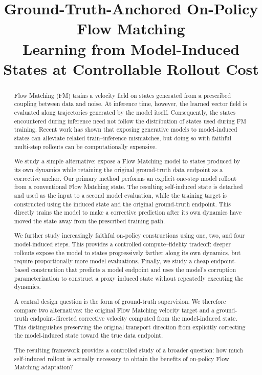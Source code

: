 \documentclass[11pt]{article}
\title{\textbf{Ground-Truth-Anchored On-Policy Flow Matching}\\
\large Learning from Model-Induced States at Controllable Rollout Cost}
\author{}
\date{}
\begin{document}
\maketitle

\begin{abstract}

Flow Matching (FM) trains a velocity field on states generated from a
prescribed coupling between data and noise. At inference time, however, the
learned vector field is evaluated along trajectories generated by the model
itself. Consequently, the states encountered during inference need not follow
the distribution of states used during FM training. Recent work has shown that
exposing generative models to model-induced states can alleviate related
train--inference mismatches, but doing so with faithful multi-step rollouts can
be computationally expensive.

We study a simple alternative: expose a Flow Matching model to states produced
by its own dynamics while retaining the original ground-truth data endpoint as
a corrective anchor. Our primary method performs an explicit one-step model
rollout from a conventional Flow Matching state. The resulting self-induced
state is detached and used as the input to a second model evaluation, while the
training target is constructed using the induced state and the original
ground-truth endpoint. This directly trains the model to make a corrective
prediction after its own dynamics have moved the state away from the prescribed
training path.

We further study increasingly faithful on-policy constructions using one, two,
and four model-induced steps. This provides a controlled compute--fidelity
tradeoff: deeper rollouts expose the model to states progressively farther
along its own dynamics, but require proportionally more model evaluations.
Finally, we study a cheap endpoint-based construction that predicts a model
endpoint and uses the model's corruption parameterization to construct a proxy
induced state without repeatedly executing the dynamics.

A central design question is the form of ground-truth supervision. We therefore
compare two alternatives: the original Flow Matching velocity target and a
ground-truth endpoint-directed corrective velocity computed from the
model-induced state. This distinguishes preserving the original transport
direction from explicitly correcting the model-induced state toward the true
data endpoint.

The resulting framework provides a controlled study of a broader question:
how much self-induced rollout is actually necessary to obtain the benefits of
on-policy Flow Matching adaptation?

\end{abstract}
\end{document}
